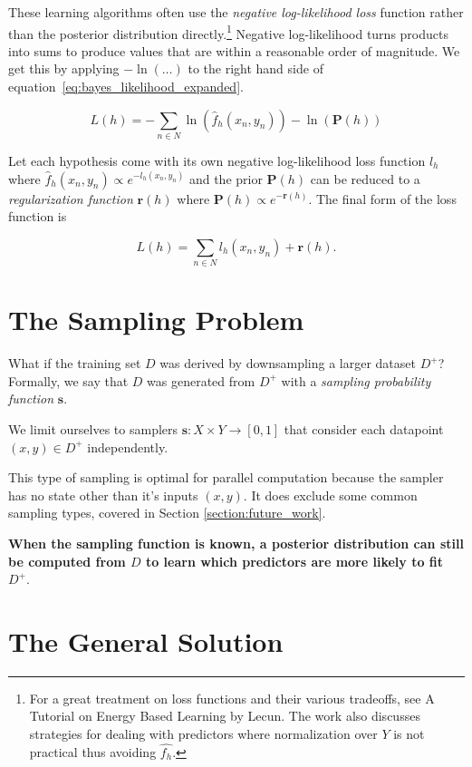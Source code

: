 \documentclass[twoside]{article}
\begin{document}
These learning algorithms often use the \textit{negative log-likelihood loss} function rather than the posterior distribution directly.\footnote{For a great treatment on loss functions and their various tradeoffs, see A Tutorial on Energy Based Learning by Lecun\cite{lecun}. The work also discusses strategies for dealing with predictors where normalization over \(Y\) is not practical thus avoiding \(\hat{f_h}\).} Negative log-likelihood turns products into sums to produce values that are within a reasonable order of magnitude. We get this by applying \(-\ln(\ldots)\) to the right hand side of equation~\eqref{eq:bayes_likelihood_expanded}.

\[L(h)=-\sum_{n \in N} \ln(\hat{f}_h(x_n,y_n))-\ln(\mathbf{P}(h))\]

Let each hypothesis come with its own negative log-likelihood loss function \(l_h\) where \(\hat{f}_h(x_n,y_n)\propto e^{-l_h(x_n,y_n)}\) and the prior \(\mathbf{P}(h)\) can be reduced to a \textit{regularization function} \(\mathbf{r}(h)\) where \(\mathbf{P}(h)\propto e^{-\mathbf{r}(h)}\). The final form of the loss function is

\[L(h)=\sum_{n \in N} l_h(x_n,y_n)+\mathbf{r}(h).\]

\section{The Sampling Problem}
\label{section:problem}

What if the training set \(D\) was derived by downsampling a larger dataset \(D^+\)? Formally, we say that \(D\) was generated from \(D^+\) with a \textit{sampling probability function} \(\mathbf{s}\).

We limit ourselves to samplers \(\mathbf{s}: X \times Y \rightarrow \left [ 0, 1\right ]\) that consider each datapoint \((x, y) \in D^+\) independently.

This type of sampling is optimal for parallel computation because the sampler has no state other than it's inputs \((x, y)\). It does exclude some common sampling types, covered in Section \ref{section:future_work}.

\textbf{When the sampling function is known, a posterior distribution can still be computed from \(D\) to learn which predictors are more likely to fit \(D^+\)}.

\section{The General Solution}
\label{section:solution}
\end{document}

